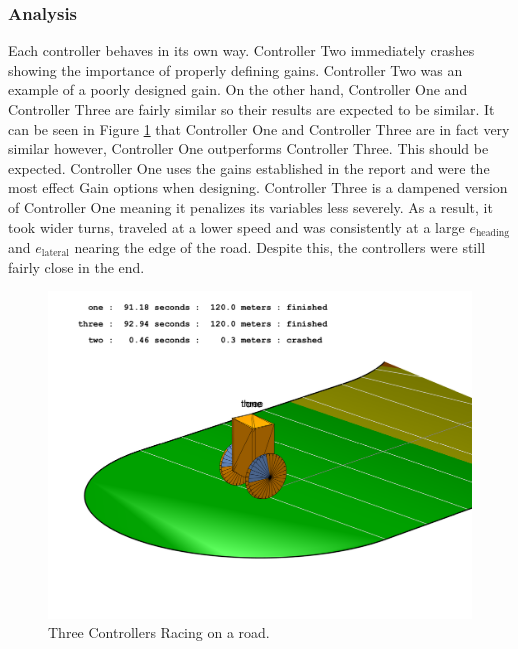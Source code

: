 \documentclass[12pt]{article}
\begin{document}
\subsubsection{Analysis}
Each controller behaves in its own way. Controller Two immediately crashes showing the importance of properly defining gains. Controller Two was an example of a poorly designed gain. On the other hand, Controller One and Controller Three are fairly similar so their results are expected to be similar. It can be seen in Figure \ref{multGain} that Controller One and Controller Three are in fact very similar however, Controller One outperforms Controller Three. This should be expected. Controller One uses the gains established in the report and were the most effect Gain options when designing. Controller Three is a dampened version of Controller One meaning it penalizes its variables less severely. As a result, it took wider turns, traveled at a lower speed and was consistently at a large $e_\text{heading}$ and $e_\text{lateral}$ nearing the edge of the road. Despite this, the controllers were still fairly close in the end.
\begin{figure}[h!]
\includegraphics[width=1\textwidth]{multGains.pdf}
\caption{Three Controllers Racing on a road.}
\label{multGain}
\end{figure}

\clearpage
\end{document}
